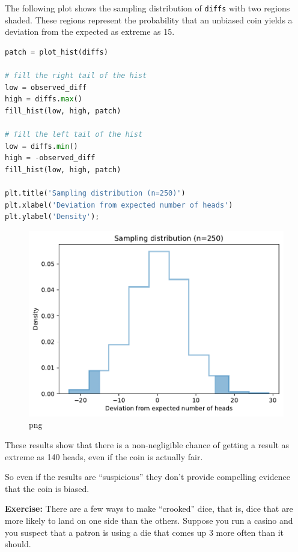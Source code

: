 The following plot shows the sampling distribution of
\passthrough{\lstinline!diffs!} with two regions shaded. These regions
represent the probability that an unbiased coin yields a deviation from
the expected as extreme as 15.

\begin{lstlisting}[language=Python]
patch = plot_hist(diffs)

# fill the right tail of the hist
low = observed_diff
high = diffs.max()
fill_hist(low, high, patch)

# fill the left tail of the hist
low = diffs.min()
high = -observed_diff
fill_hist(low, high, patch)

plt.title('Sampling distribution (n=250)')
plt.xlabel('Deviation from expected number of heads')
plt.ylabel('Density');
\end{lstlisting}

\begin{figure}
\centering
\includegraphics{11_inference_files/11_inference_42_0.pdf}
\caption{png}
\end{figure}

These results show that there is a non-negligible chance of getting a
result as extreme as 140 heads, even if the coin is actually fair.

So even if the results are ``suspicious'' they don't provide compelling
evidence that the coin is biased.

\textbf{Exercise:} There are a few ways to make ``crooked'' dice, that
is, dice that are more likely to land on one side than the others.
Suppose you run a casino and you suspect that a patron is using a die
that comes up 3 more often than it should.

